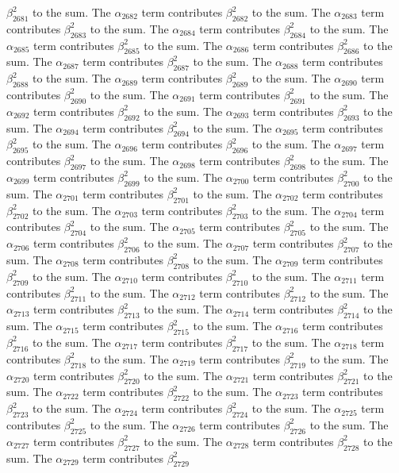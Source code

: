 \begin{lemma}
$\beta_{2681}^{2}$ to the sum. The $\alpha_{2682}$ term contributes $\beta_{2682}^{2}$ to the sum. The $\alpha_{2683}$ term contributes $\beta_{2683}^{2}$ to the sum. The $\alpha_{2684}$ term contributes $\beta_{2684}^{2}$ to the sum. The $\alpha_{2685}$ term contributes $\beta_{2685}^{2}$ to the sum. The $\alpha_{2686}$ term contributes $\beta_{2686}^{2}$ to the sum. The $\alpha_{2687}$ term contributes $\beta_{2687}^{2}$ to the sum. The $\alpha_{2688}$ term contributes $\beta_{2688}^{2}$ to the sum. The $\alpha_{2689}$ term contributes $\beta_{2689}^{2}$ to the sum. The $\alpha_{2690}$ term contributes $\beta_{2690}^{2}$ to the sum. The $\alpha_{2691}$ term contributes $\beta_{2691}^{2}$ to the sum. The $\alpha_{2692}$ term contributes $\beta_{2692}^{2}$ to the sum. The $\alpha_{2693}$ term contributes $\beta_{2693}^{2}$ to the sum. The $\alpha_{2694}$ term contributes $\beta_{2694}^{2}$ to the sum. The $\alpha_{2695}$ term contributes $\beta_{2695}^{2}$ to the sum. The $\alpha_{2696}$ term contributes $\beta_{2696}^{2}$ to the sum. The $\alpha_{2697}$ term contributes $\beta_{2697}^{2}$ to the sum. The $\alpha_{2698}$ term contributes $\beta_{2698}^{2}$ to the sum. The $\alpha_{2699}$ term contributes $\beta_{2699}^{2}$ to the sum. The $\alpha_{2700}$ term contributes $\beta_{2700}^{2}$ to the sum. The $\alpha_{2701}$ term contributes $\beta_{2701}^{2}$ to the sum. The $\alpha_{2702}$ term contributes $\beta_{2702}^{2}$ to the sum. The $\alpha_{2703}$ term contributes $\beta_{2703}^{2}$ to the sum. The $\alpha_{2704}$ term contributes $\beta_{2704}^{2}$ to the sum. The $\alpha_{2705}$ term contributes $\beta_{2705}^{2}$ to the sum. The $\alpha_{2706}$ term contributes $\beta_{2706}^{2}$ to the sum. The $\alpha_{2707}$ term contributes $\beta_{2707}^{2}$ to the sum. The $\alpha_{2708}$ term contributes $\beta_{2708}^{2}$ to the sum. The $\alpha_{2709}$ term contributes $\beta_{2709}^{2}$ to the sum. The $\alpha_{2710}$ term contributes $\beta_{2710}^{2}$ to the sum. The $\alpha_{2711}$ term contributes $\beta_{2711}^{2}$ to the sum. The $\alpha_{2712}$ term contributes $\beta_{2712}^{2}$ to the sum. The $\alpha_{2713}$ term contributes $\beta_{2713}^{2}$ to the sum. The $\alpha_{2714}$ term contributes $\beta_{2714}^{2}$ to the sum. The $\alpha_{2715}$ term contributes $\beta_{2715}^{2}$ to the sum. The $\alpha_{2716}$ term contributes $\beta_{2716}^{2}$ to the sum. The $\alpha_{2717}$ term contributes $\beta_{2717}^{2}$ to the sum. The $\alpha_{2718}$ term contributes $\beta_{2718}^{2}$ to the sum. The $\alpha_{2719}$ term contributes $\beta_{2719}^{2}$ to the sum. The $\alpha_{2720}$ term contributes $\beta_{2720}^{2}$ to the sum. The $\alpha_{2721}$ term contributes $\beta_{2721}^{2}$ to the sum. The $\alpha_{2722}$ term contributes $\beta_{2722}^{2}$ to the sum. The $\alpha_{2723}$ term contributes $\beta_{2723}^{2}$ to the sum. The $\alpha_{2724}$ term contributes $\beta_{2724}^{2}$ to the sum. The $\alpha_{2725}$ term contributes $\beta_{2725}^{2}$ to the sum. The $\alpha_{2726}$ term contributes $\beta_{2726}^{2}$ to the sum. The $\alpha_{2727}$ term contributes $\beta_{2727}^{2}$ to the sum. The $\alpha_{2728}$ term contributes $\beta_{2728}^{2}$ to the sum. The $\alpha_{2729}$ term contributes $\beta_{2729}^{2}$ 
\end{lemma}

